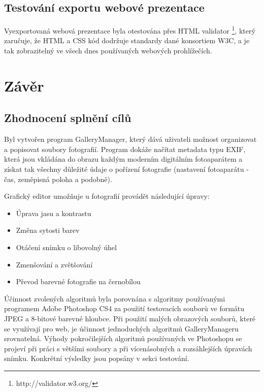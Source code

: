 \documentclass[11pt,twoside,a4paper]{book}
\begin{document}
\section{Testování exportu webové prezentace}
\noindent
Vyexportovaná webová prezentace byla otestována přes HTML validator \footnote{http://validator.w3.org/}, který zaručuje, že HTML a CSS kód dodržuje standardy dané konsortiem W3C, a je tak zobrazitelný ve všech dnes používaných webových prohlížečích.



\chapter{Závěr}

\section{Zhodnocení splnění cílů}
\noindent
Byl vytvořen program GalleryManager, který dává uživateli možnost organizovat a popisovat soubory fotografií. Program dokáže načítat metadata typu EXIF, která jsou vkládána do obrazu každým moderním digitálním fotoaparátem a získat tak všechny důležité údaje o pořízení fotografie (nastavení fotoaparátu - čas, zeměpisná poloha a podobně). 

\indent
Grafický editor umožňuje u fotografií provádět následující úpravy:
\begin{itemize}
\item Úprava jasu a kontrastu
\item Změna sytosti barev
\item Otáčení snímku o libovolný úhel
\item Zmenšování a zvětšování
\item Převod barevné fotografie na černobílou
\end{itemize}
\noindent 
Účinnost zvolených algoritmů byla porovnána s algoritmy používanými programem Adobe Photoshop CS4 za použití testovacích souborů ve formátu JPEG a 8-bitové barevné hloubce. Při použití malých obrazových souborů, které se využívají pro web, je účinnost jednoduchých algoritmů GalleryManageru srovnatelná. Výhody pokročilejších algoritmů používaných ve Photoshopu se projeví při práci s většími soubory a při vícenásobných a rozsáhlejších úpravách snímku. Konkrétní výsledky jsou popsány v sekci testování.
\end{document}
